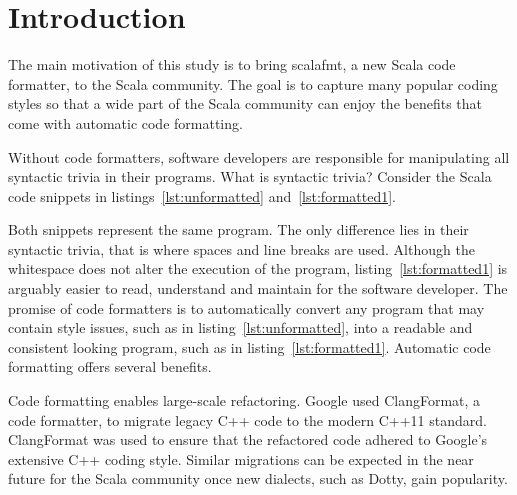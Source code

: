 
\section{Introduction} %
\label{sec:Introduction}
\lstset{style=scala}
The main motivation of this study is to bring scalafmt, a new Scala code formatter, to the Scala community.
The goal is to capture many popular coding styles so that a wide part of the Scala community can enjoy the benefits that come with automatic code formatting.

Without code formatters, software developers are responsible for manipulating all syntactic trivia in their programs.
What is syntactic trivia?
Consider the Scala code snippets in listings~\ref{lst:unformatted} and~\ref{lst:formatted1}.

\begin{minipage}{.45\textwidth}

\end{minipage}
\hfil
\begin{minipage}{.45\textwidth}

\end{minipage}

Both snippets represent the same program.
The only difference lies in their syntactic trivia, that is where spaces and line breaks are used.
Although the whitespace does not alter the execution of the program, listing~\ref{lst:formatted1} is arguably easier to read, understand and maintain for the software developer.
The promise of code formatters is to automatically convert any program that may contain style issues, such as in listing~\ref{lst:unformatted}, into a readable and consistent looking program, such as in listing~\ref{lst:formatted1}.
Automatic code formatting offers several benefits.

Code formatting enables large-scale refactoring.
Google used ClangFormat\autocite{jasper_clangformat_2013}, a code formatter, to migrate legacy C++ code to the modern C++11 standard\autocite{wright_large-scale_2013}.
ClangFormat was used to ensure that the refactored code adhered to Google's extensive C++ coding style\autocite{_google_????}.
Similar migrations can be expected in the near future for the Scala community once new dialects, such as Dotty\autocite{rompf_f_2015}, gain popularity.

